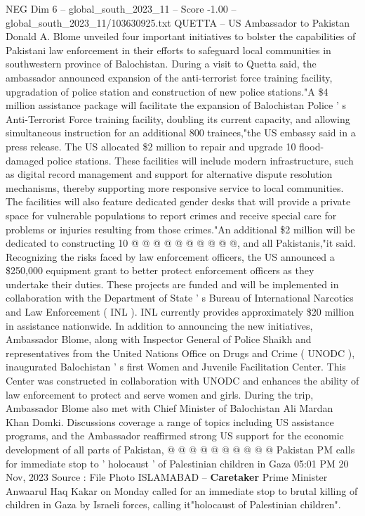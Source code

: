 \begin{textsample}{NEG Dim 6 – global\_south\_2023\_11 – Score -1.00 – global\_south\_2023\_11/103630925.txt}  \label{ex:f6_neg_187}
QUETTA -- US Ambassador to Pakistan Donald A.
Blome unveiled four important initiatives to bolster the capabilities of Pakistani law enforcement in their efforts to safeguard local communities in southwestern province of Balochistan.
During a visit to Quetta said, the ambassador announced expansion of the anti-terrorist force training facility, upgradation of police station and construction of new police stations."A \$4 million assistance package will facilitate the expansion of Balochistan Police ' s Anti-Terrorist Force training facility, doubling its current capacity, and allowing simultaneous instruction for an additional 800 trainees,"the US embassy said in a press release.
The US allocated \$2 million to repair and upgrade 10 flood-damaged police stations.
These facilities will include modern infrastructure, such as digital record management and support for alternative dispute resolution mechanisms, thereby supporting more responsive service to local communities.
The facilities will also feature dedicated gender desks that will provide a private space for vulnerable populations to report crimes and receive special care for problems or injuries resulting from those crimes."An additional \$2 million will be dedicated to constructing 10 @ @ @ @ @ @ @ @ @ @, and all Pakistanis,"it said.
Recognizing the risks faced by law enforcement officers, the US announced a \$250,000 equipment grant to better protect enforcement officers as they undertake their duties.
These projects are funded and will be implemented in collaboration with the Department of State ' s Bureau of International Narcotics and Law Enforcement ( INL ).
INL currently provides approximately \$20 million in assistance nationwide.
In addition to announcing the new initiatives, Ambassador Blome, along with Inspector General of Police Shaikh and representatives from the United Nations Office on Drugs and Crime ( UNODC ), inaugurated Balochistan ' s first Women and Juvenile Facilitation Center.
This Center was constructed in collaboration with UNODC and enhances the ability of law enforcement to protect and serve women and girls.
During the trip, Ambassador Blome also met with Chief Minister of Balochistan Ali Mardan Khan Domki.
Discussions coverage a range of topics including US assistance programs, and the Ambassador reaffirmed strong US support for the economic development of all parts of Pakistan, @ @ @ @ @ @ @ @ @ @ Pakistan PM calls for immediate stop to ' holocaust ' of Palestinian children in Gaza 05:01 PM 20 Nov, 2023 Source : File Photo ISLAMABAD -- \textbf{Caretaker} Prime Minister Anwaarul Haq Kakar on Monday called for an immediate stop to brutal killing of children in Gaza by Israeli forces, calling it"holocaust of Palestinian children".

\end{textsample}
